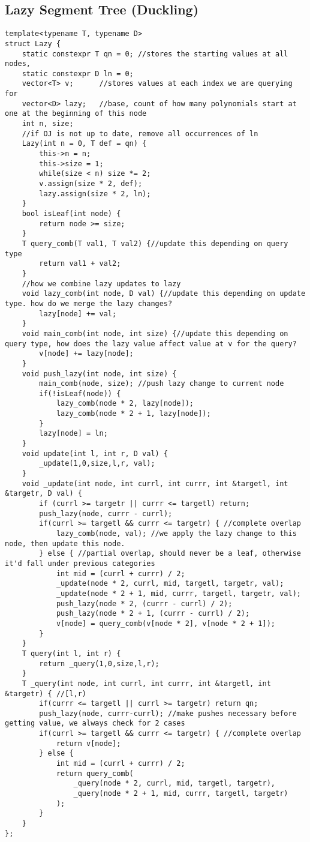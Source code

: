 \documentclass[8pt, headheight=10pt, a4paper]{article}
\begin{document}
\begin{multicols*}{3}
\subsection{Lazy Segment Tree (Duckling)}
\begin{lstlisting}
template<typename T, typename D>
struct Lazy {
    static constexpr T qn = 0; //stores the starting values at all nodes, 
    static constexpr D ln = 0;
    vector<T> v;      //stores values at each index we are querying for
    vector<D> lazy;   //base, count of how many polynomials start at one at the beginning of this node
    int n, size;
    //if OJ is not up to date, remove all occurrences of ln
    Lazy(int n = 0, T def = qn) {
        this->n = n;
        this->size = 1;
        while(size < n) size *= 2;
        v.assign(size * 2, def);
        lazy.assign(size * 2, ln);
    }
    bool isLeaf(int node) {
        return node >= size;
    }
    T query_comb(T val1, T val2) {//update this depending on query type
        return val1 + val2;
    }
    //how we combine lazy updates to lazy
    void lazy_comb(int node, D val) {//update this depending on update type. how do we merge the lazy changes?
        lazy[node] += val;
    }
    void main_comb(int node, int size) {//update this depending on query type, how does the lazy value affect value at v for the query?
        v[node] += lazy[node];
    }
    void push_lazy(int node, int size) {
        main_comb(node, size); //push lazy change to current node
        if(!isLeaf(node)) {
            lazy_comb(node * 2, lazy[node]);
            lazy_comb(node * 2 + 1, lazy[node]);
        }
        lazy[node] = ln;
    }
    void update(int l, int r, D val) {
        _update(1,0,size,l,r, val);
    }
    void _update(int node, int currl, int currr, int &targetl, int &targetr, D val) {
        if (currl >= targetr || currr <= targetl) return;
        push_lazy(node, currr - currl);
        if(currl >= targetl && currr <= targetr) { //complete overlap
            lazy_comb(node, val); //we apply the lazy change to this node, then update this node.
        } else { //partial overlap, should never be a leaf, otherwise it'd fall under previous categories 
            int mid = (currl + currr) / 2;
            _update(node * 2, currl, mid, targetl, targetr, val);
            _update(node * 2 + 1, mid, currr, targetl, targetr, val);
            push_lazy(node * 2, (currr - currl) / 2);
            push_lazy(node * 2 + 1, (currr - currl) / 2);
            v[node] = query_comb(v[node * 2], v[node * 2 + 1]);
        }
    }
    T query(int l, int r) {
        return _query(1,0,size,l,r);
    }
    T _query(int node, int currl, int currr, int &targetl, int &targetr) { //[l,r)
        if(currr <= targetl || currl >= targetr) return qn; 
        push_lazy(node, currr-currl); //make pushes necessary before getting value, we always check for 2 cases
        if(currl >= targetl && currr <= targetr) { //complete overlap
            return v[node];
        } else {
            int mid = (currl + currr) / 2;
            return query_comb(
                _query(node * 2, currl, mid, targetl, targetr),
                _query(node * 2 + 1, mid, currr, targetl, targetr)
            );
        }
    }
};
\end{lstlisting}


\end{multicols*}
\end{document}
